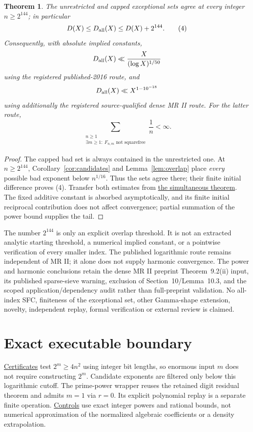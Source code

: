 \documentclass[11pt]{article}
\newtheorem{theorem}{Theorem}
\begin{document}
\begin{theorem}\label{thm:all}
The unrestricted and capped exceptional sets agree at every integer
$n\ge2^{144}$; in particular
\[
 D(X)\le D_{\rm all}(X)\le D(X)+2^{144}. \tag{4}
\]
Consequently, with absolute implied constants,
\[
 D_{\rm all}(X)\ll\frac{X}{(\log X)^{1/50}}
\]
using the registered published-2016 route, and
\[
 D_{\rm all}(X)\ll X^{1-10^{-18}}
\]
using additionally the registered source-qualified dense MR II route.
For the latter route,
\[
 \sum_{\substack{n\ge1\\\exists m\ge1:\ F_{n,m}\text{ not squarefree}}}\frac1n<\infty.
\]
\end{theorem}
\begin{proof}
The capped bad set is always contained in the unrestricted one.
At $n\ge2^{144}$, Corollary~\ref{cor:candidates} and Lemma~\ref{lem:overlap}
place \emph{every} possible bad exponent below $n^{1/16}$.
Thus the sets agree there; their finite initial difference proves (4).
Transfer both estimates from
\href{SIMULTANEOUS_EXPONENTS_AND_POWER_SAVING.tex}{the simultaneous theorem}.
The fixed additive constant is absorbed asymptotically, and its finite
initial reciprocal contribution does not affect convergence; partial
summation of the power bound supplies the tail.
\end{proof}
The number $2^{144}$ is only an explicit overlap threshold. It is not an
extracted analytic starting threshold, a numerical implied constant, or
a pointwise verification of every smaller index.
The published logarithmic route remains independent of MR II; it alone
does not supply harmonic convergence. The power and harmonic conclusions
retain the dense MR II preprint Theorem~9.2(ii) input, its published
sparse-sieve warning, exclusion of Section~10/Lemma~10.3, and the scoped
application/dependency audit rather than full-preprint validation.
No all-index SFC, finiteness of the exceptional set, other Gamma-shape
extension, novelty, independent replay, formal verification or external
review is claimed.

\section{Exact executable boundary}
\href{all_exponent_squarefree.py}{Certificates} test $2^m\ge4n^2$ using
integer bit lengths, so enormous input $m$ does not require constructing
$2^m$. Candidate exponents are filtered only below this logarithmic cutoff.
The prime-power wrapper reuses the retained digit residual theorem and
admits $m=1$ via $r=0$. Its explicit polynomial replay is a separate finite
operation. \href{verify_all_exponent_squarefree.py}{Controls} use exact
integer powers and rational bounds, not numerical approximation of the
normalized algebraic coefficients or a density extrapolation.
\end{document}
